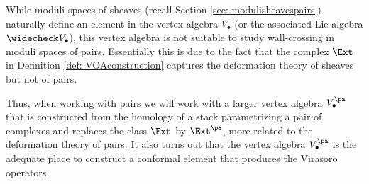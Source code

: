 While moduli spaces of sheaves (recall Section \ref{sec: modulisheavespairs}) naturally define an element in the vertex algebra $V_\bullet$ (or the associated Lie algebra $\widecheck V_\bullet$), this vertex algebra is not suitable to study wall-crossing in moduli spaces of pairs. Essentially this is due to the fact that the complex $\Ext$ in Definition \ref{def: VOAconstruction} captures the deformation theory of sheaves but not of pairs.

Thus, when working with pairs we will work with a larger vertex algebra $V_\bullet^{\pa}$ that is constructed from the homology of a stack parametrizing a pair of complexes and replaces the class $\Ext$ by $\Ext^{\pa}$, more related to the deformation theory of pairs. It also turns out that the vertex algebra $V_\bullet^{\pa}$ is the adequate place to construct a conformal element that produces the Virasoro operators.



